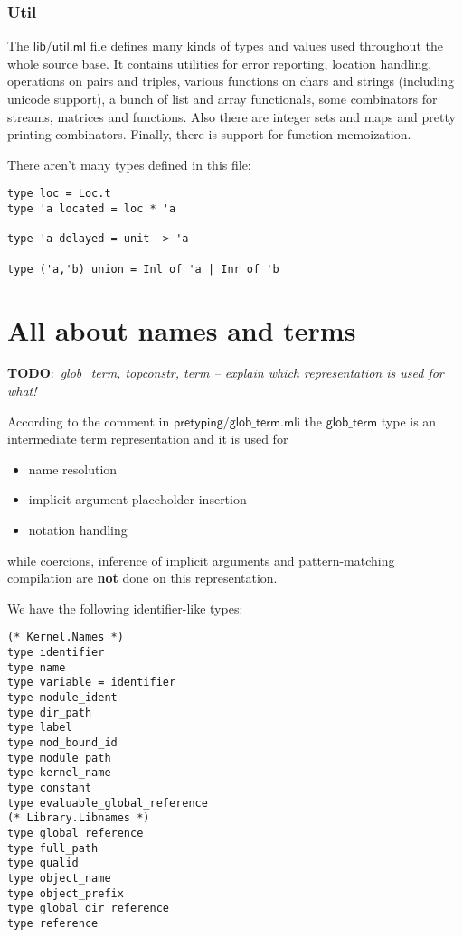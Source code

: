 \documentclass[a4paper,oneside]{book}
\newcommand{\m}[1]{\ensuremath{\mathsf{#1}}}
\newcommand{\TODO}[1]{\textbf{TODO}:\ \emph{#1}}
\begin{document}
\subsection{Util}

The \m{lib/util.ml} file defines many kinds of types and values used
throughout the whole source base. It contains utilities for error
reporting, location handling, operations on pairs and triples, various
functions on chars and strings (including unicode support), a bunch of
list and array functionals, some combinators for streams, matrices and
functions. Also there are integer sets and maps and pretty printing
combinators. Finally, there is support for function memoization.

There aren't many types defined in this file:

\begin{lstlisting}
type loc = Loc.t
type 'a located = loc * 'a

type 'a delayed = unit -> 'a

type ('a,'b) union = Inl of 'a | Inr of 'b
\end{lstlisting}

\chapter{All about names and terms}

\TODO{glob\_term, topconstr, term -- explain which representation is
  used for what!}

According to the comment in \m{pretyping/glob\_term.mli} the
\m{glob\_term} type is an intermediate term representation and it is
used for
\begin{itemize}
\item name resolution
\item implicit argument placeholder insertion
\item notation handling
\end{itemize}
while coercions, inference of implicit arguments and pattern-matching
compilation are \textbf{not} done on this representation.

We have the following identifier-like types:

\begin{lstlisting}
(* Kernel.Names *)
type identifier
type name
type variable = identifier
type module_ident
type dir_path
type label
type mod_bound_id
type module_path
type kernel_name
type constant
type evaluable_global_reference
(* Library.Libnames *)
type global_reference
type full_path
type qualid
type object_name
type object_prefix
type global_dir_reference
type reference    
\end{lstlisting}
\end{document}
